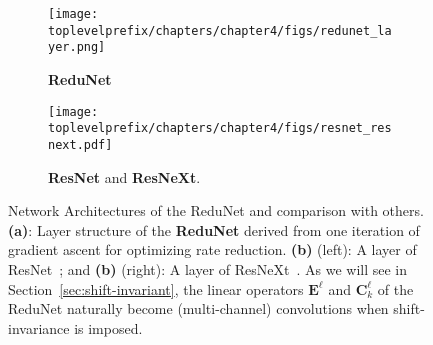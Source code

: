 \documentclass[../../book-main.tex]{subfiles}
\begin{document}
\begin{figure}[t]
    \begin{subfigure}[t]{0.35\textwidth}
        \centering
        \texttt{[image: \\toplevelprefix/chapters/chapter4/figs/redunet\_layer.png]}
        \caption{\textbf{ReduNet}}
    \end{subfigure}
    \hfill 
    \begin{subfigure}[t]{0.6\textwidth}
        \centering
        \texttt{[image: \\toplevelprefix/chapters/chapter4/figs/resnet\_resnext.pdf]}
        \caption{\textbf{ResNet} and \textbf{ResNeXt}.}
    \end{subfigure}
    \caption{\small Network Architectures of the ReduNet and comparison with others. \textbf{(a)}: Layer structure of the \textbf{ReduNet} derived from one iteration of gradient ascent for optimizing rate reduction. \textbf{(b)} (left): A layer of ResNet~\cite{he2016deep}; and \textbf{(b)} (right): A layer of ResNeXt~\cite{ResNEXT}. As we will see in Section~\ref{sec:shift-invariant}, the linear operators $\bm E^\ell$ and $\bm{C}_k^\ell$ of the ReduNet naturally become (multi-channel) convolutions when shift-invariance is imposed.}
    \label{fig:arch-ReduNet}
\end{figure}
\end{document}
